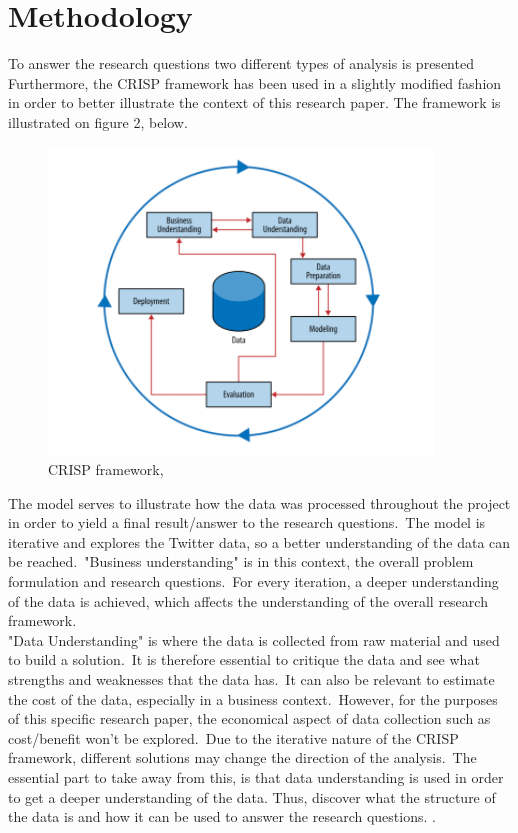 \documentclass[12pt]{article}
\begin{document}
\section{Methodology}
To answer the research questions two different types of analysis is presented\\


Furthermore,  the CRISP framework has been used in a slightly modified fashion in order to better illustrate the context of this research paper. The framework is illustrated on figure 2, below.\\

\begin{figure}[H] %
	\centering %
\includegraphics [scale= .95]  {CRISP.PNG}    %
	\caption[Optional caption] {CRISP framework, \citep{foster}}
	\label{fig:wordcloudBliz}

\end{figure}

The model serves to illustrate how the data was processed throughout the project in order to yield a final result/answer to the research questions.\ The model is iterative and explores the Twitter data, so a better understanding of the data can be reached.\ "Business understanding" is in this context, the overall problem formulation and research questions.\ For every iteration, a deeper understanding of the data is achieved, which affects the understanding of the overall research framework.\ \\ 

"Data Understanding" is where the data is collected from raw material and used to build a solution.\ It is therefore essential to critique the data and see what strengths and weaknesses that the data has.\ It can also be relevant to estimate the cost of the data, especially in a business context.\ However, for the purposes of this specific research paper, the economical aspect of data collection such as cost/benefit won't be explored.\ Due to the iterative nature of the CRISP framework, different solutions may change the direction of the analysis.\ The essential part to take away from this, is that  data understanding is used in order to get a deeper understanding of the data. Thus, discover what the structure of the data is and how it can be used to answer the research questions. . \\
\end{document}
